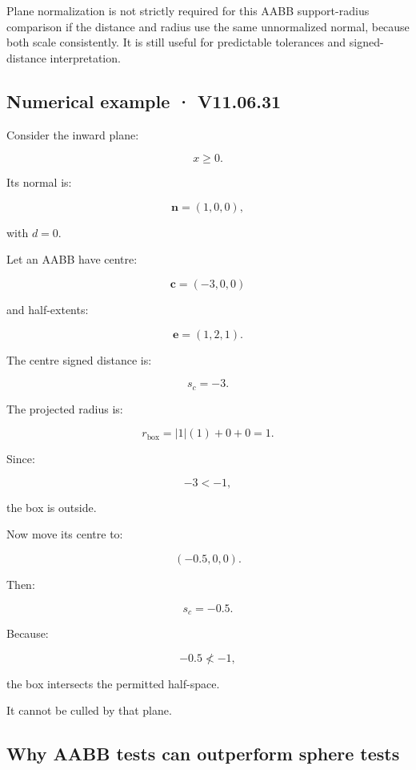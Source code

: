 Plane normalization is not strictly required for this AABB support-radius comparison if the distance and radius use the same unnormalized normal, because both scale consistently. It is still useful for predictable tolerances and signed-distance interpretation.

\subsection{Numerical example · V11.06.31}\label{02-foundations-ii-ch034-numerical-example-v11.06.31}

\hypertarget{02-foundations-ii-ch034-numerical-example-v11.06.31}{}

Consider the inward plane:

\[
 x\ge0.
\]

Its normal is:

\[
 \mathbf n=(1,0,0),
\]

with \(d=0\).

Let an AABB have centre:

\[
 \mathbf c=(-3,0,0)
\]

and half-extents:

\[
 \mathbf e=(1,2,1).
\]

The centre signed distance is:

\[
 s_c=-3.
\]

The projected radius is:

\[
 r_{\mathrm{box}}= |1|(1)+0+0=1.
\]

Since:

\[
 -3<-1,
\]

the box is outside.

Now move its centre to:

\[
 (-0.5,0,0).
\]

Then:

\[
 s_c=-0.5.
\]

Because:

\[
 -0.5\not<-1,
\]

the box intersects the permitted half-space.

It cannot be culled by that plane.

\subsection{Why AABB tests can outperform sphere tests}\label{02-foundations-ii-ch034-why-aabb-tests-can-outperform-sphere-tests}

\hypertarget{02-foundations-ii-ch034-why-aabb-tests-can-outperform-sphere-tests}{}

